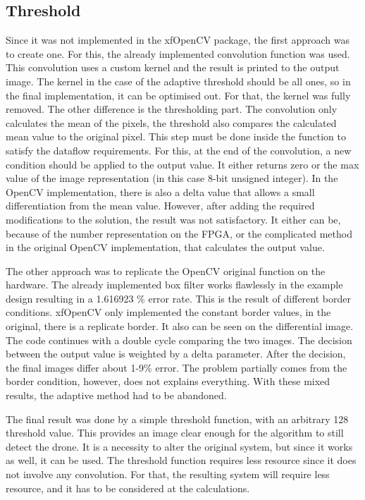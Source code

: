 \subsection{Threshold} %
Since it was not implemented in the xfOpenCV package, the first approach was to create one.
For this, the already implemented convolution function was used.
This convolution uses a custom kernel and the result is printed to the output image.
The kernel in the case of the adaptive threshold should be all ones, so in the final implementation, it can be optimised out.
For that, the kernel was fully removed.
The other difference is the thresholding part.
The convolution only calculates the mean of the pixels, the threshold also compares the calculated mean value to the original pixel.
This step must be done inside the function to satisfy the dataflow requirements.
For this, at the end of the convolution, a new condition should be applied to the output value.
It either returns zero or the max value of the image representation (in this case 8-bit unsigned integer).
In the OpenCV implementation, there is also a delta value that allows a small differentiation from the mean value.
However, after adding the required modifications to the solution, the result was not satisfactory.
It either can be, because of the number representation on the FPGA, or the complicated method in the original OpenCV implementation, that calculates the output value.

The other approach was to replicate the OpenCV original function on the hardware.
The already implemented box filter works flawlessly in the example design resulting in a 1.616923 \% error rate.
This is the result of different border conditions.
xfOpenCV only implemented the constant border values, in the original, there is a replicate border.
It also can be seen on the differential image.
The code continues with a double cycle comparing the two images.
The decision between the output value is weighted by a delta parameter.
After the decision, the final images differ about 1-9\% error.
The problem partially comes from the border condition, however, does not explains everything.
With these mixed results, the adaptive method had to be abandoned.

The final result was done by a simple threshold function, with an arbitrary 128 threshold value.
This provides an image clear enough for the algorithm to still detect the drone.
It is a necessity to alter the original system, but since it works as well, it can be used.
The threshold function requires less resource since it does not involve any convolution.
For that, the resulting system will require less resource, and it has to be considered at the calculations.

